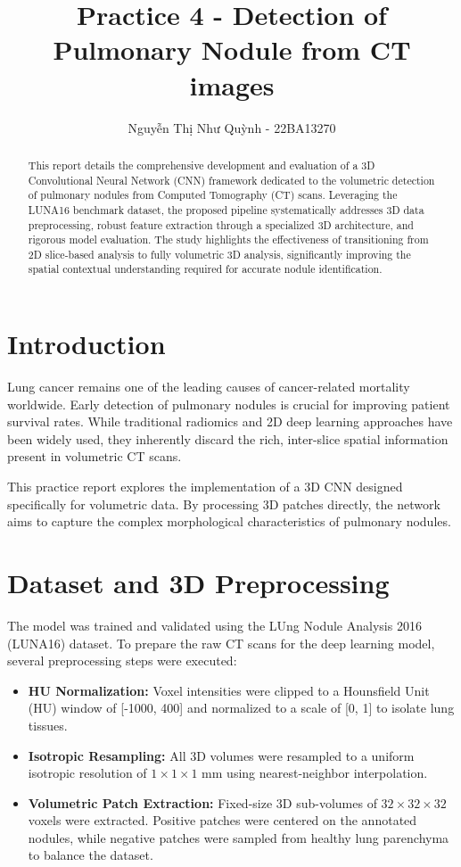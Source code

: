 \documentclass[10pt, twocolumn, a4paper]{article}
\title{\Large \textbf{Practice  4 - Detection of Pulmonary Nodule from CT images}}
\author{Nguyễn Thị Như Quỳnh - 22BA13270}
\date{}
\begin{document}
\maketitle

\begin{abstract}
This report details the comprehensive development and evaluation of a 3D Convolutional Neural Network (CNN) framework dedicated to the volumetric detection of pulmonary nodules from Computed Tomography (CT) scans. Leveraging the LUNA16 benchmark dataset, the proposed pipeline systematically addresses 3D data preprocessing, robust feature extraction through a specialized 3D architecture, and rigorous model evaluation. The study highlights the effectiveness of transitioning from 2D slice-based analysis to fully volumetric 3D analysis, significantly improving the spatial contextual understanding required for accurate nodule identification.
\end{abstract}

\section{Introduction}
Lung cancer remains one of the leading causes of cancer-related mortality worldwide. Early detection of pulmonary nodules is crucial for improving patient survival rates. While traditional radiomics and 2D deep learning approaches have been widely used, they inherently discard the rich, inter-slice spatial information present in volumetric CT scans. 

This practice report explores the implementation of a 3D CNN designed specifically for volumetric data. By processing 3D patches directly, the network aims to capture the complex morphological characteristics of pulmonary nodules. 

\section{Dataset and 3D Preprocessing}
The model was trained and validated using the LUng Nodule Analysis 2016 (LUNA16) dataset. To prepare the raw CT scans for the deep learning model, several preprocessing steps were executed:

\begin{itemize}
    \item \textbf{HU Normalization:} Voxel intensities were clipped to a Hounsfield Unit (HU) window of [-1000, 400] and normalized to a scale of [0, 1] to isolate lung tissues.
    \item \textbf{Isotropic Resampling:} All 3D volumes were resampled to a uniform isotropic resolution of $1 \times 1 \times 1$ mm using nearest-neighbor interpolation.
    \item \textbf{Volumetric Patch Extraction:} Fixed-size 3D sub-volumes of $32 \times 32 \times 32$ voxels were extracted. Positive patches were centered on the annotated nodules, while negative patches were sampled from healthy lung parenchyma to balance the dataset.
\end{itemize}
\end{document}
